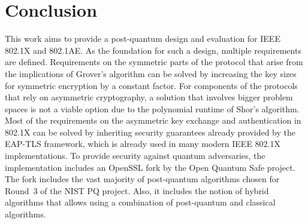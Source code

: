 \chapter{Conclusion}

This work aims to provide a post-quantum design and evaluation for IEEE 802.1X and 802.1AE. As the foundation for such a design, multiple requirements are defined. Requirements on the symmetric parts of the protocol that arise from the implications of Grover's algorithm can be solved by increasing the key sizes for symmetric encryption by a constant factor. For components of the protocols that rely on asymmetric cryptography, a solution that involves bigger problem spaces is not a viable option due to the polynomial runtime of Shor's algorithm. Most of the requirements on the asymmetric key exchange and authentication in 802.1X can be solved by inheriting security guarantees already provided by the EAP-TLS framework, which is already used in many modern IEEE 802.1X implementations. To provide security against quantum adversaries, the implementation includes an OpenSSL fork by the Open Quantum Safe project. The fork includes the vast majority of post-quantum algorithms chosen for Round~3 of the \ac{NIST} \ac{PQ} project. Also, it includes the notion of hybrid algorithms that allows using a combination of post-quantum and classical algorithms.

